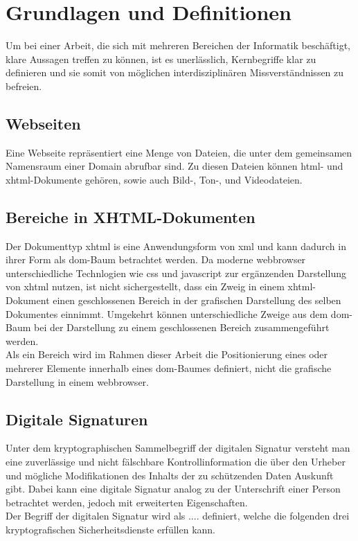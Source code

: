 
\chapter{Grundlagen und Definitionen}
\label{chp:GrundlagenDefinitionen}

Um bei einer Arbeit, die sich mit mehreren Bereichen der Informatik beschäftigt, klare Aussagen treffen zu können, ist es unerlässlich, Kernbegriffe klar zu
definieren und sie somit von möglichen interdisziplinären Missverständnissen zu befreien.

\section{Webseiten}
\label{sec:GrundlagenDefinitionen:Webseiten}
Eine Webseite repräsentiert eine Menge von Dateien, die unter dem gemeinsamen Namensraum einer Domain abrufbar sind. Zu diesen Dateien können \gls{html}- und
\gls{xhtml}-Dokumente gehören, sowie auch Bild-, Ton-, und Videodateien.

\section{Bereiche in XHTML-Dokumenten}
\label{sec:GrundlagenDefinitionen:BereicheXHTML}
Der Dokumenttyp \gls{xhtml} is eine Anwendungsform von \gls{xml}\cite{xhtml:w3c} und kann dadurch in ihrer Form als \gls{dom}-Baum betrachtet
werden\cite{xhtml:oreilly}. Da moderne \Gls{webbrowser} unterschiedliche Technlogien wie \gls{css} und \gls{javascript} zur ergänzenden Darstellung von
\gls{xhtml} nutzen, ist nicht sichergestellt, dass ein Zweig in einem \gls{xhtml}-Dokument einen geschlossenen Bereich in der grafischen Darstellung des
selben Dokumentes einnimmt. Umgekehrt können unterschiedliche Zweige aus dem \gls{dom}-Baum bei der Darstellung zu einem geschlossenen Bereich zusammengeführt
werden.\\

Als ein Bereich wird im Rahmen dieser Arbeit die Positionierung eines oder mehrerer Elemente innerhalb eines \gls{dom}-Baumes definiert, nicht die grafische
Darstellung in einem \gls{webbrowser}.

\section{Digitale Signaturen}
\label{sec:GrundlagenDefinitionen:DigitaleSignaturen}
Unter dem kryptographischen Sammelbegriff der digitalen Signatur versteht man eine zuverlässige und nicht fälschbare Kontrollinformation die über den Urheber
und mögliche Modifikationen des Inhalts der zu schützenden Daten Auskunft gibt\cite{kits}. Dabei kann eine digitale Signatur analog zu der Unterschrift
einer Person betrachtet werden\cite{esig:bsi}, jedoch mit erweiterten Eigenschaften.\\
Der Begriff der digitalen Signatur wird als .... definiert, welche die folgenden drei kryptografischen Sicherheitsdienste erfüllen kann.

